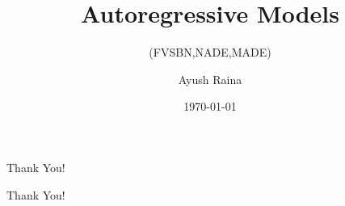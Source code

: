 \documentclass{beamer}
\author{Ayush Raina}
\title{Autoregressive Models}
\subtitle{(FVSBN,NADE,MADE)}
\institute{
    Indian Institute of Science \\
}
\date{\today}
\begin{document}
\begin{frame}
    \titlepage
\end{frame}
    



  

\begin{frame}{Thank You!}
    \begin{center}
        \Huge Thank You!
    \end{center}
\end{frame}
\end{document}
